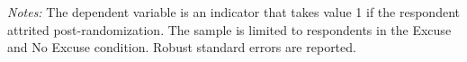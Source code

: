 \footnotesize
\insertTableNotes
\textit{Notes: }The dependent variable is an indicator that takes value 1 if the respondent attrited post-randomization. The sample is limited to respondents in the Excuse and No Excuse condition. Robust standard errors are reported.
